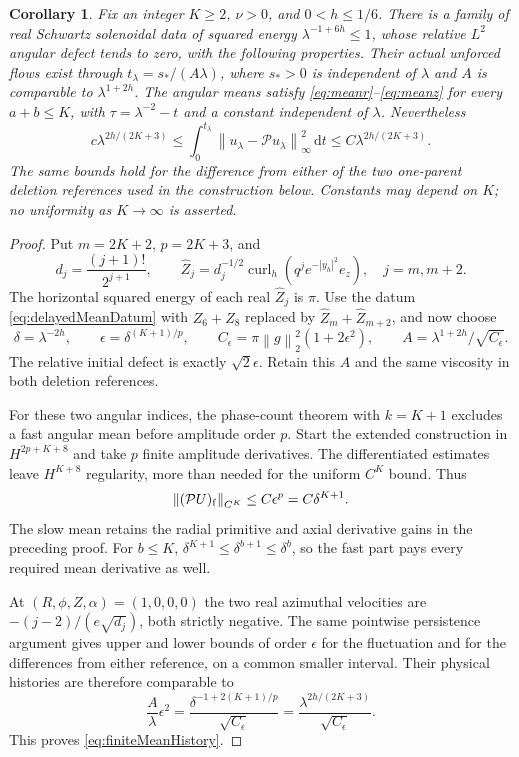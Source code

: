 \documentclass[11pt]{article}
\newtheorem{corollary}[theorem]{Corollary}
\theoremstyle{remark}
\newcommand{\PP}{\mathcal P}
\newcommand{\dd}{\,\mathrm d}
\newcommand{\norm}[1]{\left\lVert#1\right\rVert}
\newcommand{\curl}{\operatorname{curl}}
\begin{document}
\begin{corollary}\label{cor:finiteMeanDerivatives}
Fix an integer $K\geq2$, $\nu>0$, and $0<h\leq1/6$.
There is a family of real Schwartz solenoidal data of squared energy
$\lambda^{-1+6h}\leq1$, whose relative $L^2$ angular defect tends to
zero, with the following properties. Their actual unforced flows
exist through $t_\lambda=s_*/(A\lambda)$, where $s_*>0$ is independent
of $\lambda$ and $A$ is comparable to $\lambda^{1+2h}$.
The angular means satisfy \eqref{eq:meanr}--\eqref{eq:meanz} for
\emph{every} $a+b\leq K$, with $\tau=\lambda^{-2}-t$ and a
constant independent of $\lambda$. Nevertheless
\begin{equation}\label{eq:finiteMeanHistory}
 c\lambda^{2h/(2K+3)}
 \leq\int_0^{t_\lambda}\norm{u_\lambda-\PP u_\lambda}_\infty^2\dd t
 \leq C\lambda^{2h/(2K+3)}.
\end{equation}
The same bounds hold for the difference from either of the two
one-parent deletion references used in the construction below.
Constants may depend on $K$; no uniformity as $K\to\infty$ is asserted.
\end{corollary}

\begin{proof}
Put $m=2K+2$, $p=2K+3$, and
\[
 d_j=\frac{(j+1)!}{2^{j+1}},\qquad
 \widehat Z_j=d_j^{-1/2}\curl_h(q^j e^{-|y_h|^2}e_z),
                       \quad j=m,m+2.
\]
The horizontal squared energy of each real $\widehat Z_j$ is $\pi$.
Use the datum \eqref{eq:delayedMeanDatum} with $Z_6+Z_8$ replaced
by $\widehat Z_m+\widehat Z_{m+2}$, and now choose
\[
 \delta=\lambda^{-2h},\qquad
 \epsilon=\delta^{(K+1)/p},\qquad
 C_\epsilon=\pi\norm g_2^2(1+2\epsilon^2),\qquad
 A=\lambda^{1+2h}/\sqrt{C_\epsilon}.
\]
The relative initial defect is exactly $\sqrt2\epsilon$.
Retain this $A$ and the same viscosity in both deletion references.

For these two angular indices, the phase-count theorem with $k=K+1$
excludes a fast angular mean before amplitude order $p$.
Start the extended construction in $H^{2p+K+8}$ and take $p$ finite
amplitude derivatives. The differentiated estimates leave $H^{K+8}$
regularity, more than needed for the uniform $C^K$ bound. Thus
\[
 \norm{(\PP U)_{\rm f}}_{C^K}\leq C\epsilon^p
                                      =C\delta^{K+1}.
\]
The slow mean retains the radial primitive and axial derivative
gains in the preceding proof. For $b\leq K$,
$\delta^{K+1}\leq\delta^{b+1}\leq\delta^b$, so the fast part
pays every required mean derivative as well.

At $(R,\phi,Z,\alpha)=(1,0,0,0)$ the two real azimuthal
velocities are $-(j-2)/(e\sqrt{d_j})$, both strictly negative.
The same pointwise persistence argument gives upper and lower
bounds of order $\epsilon$ for the fluctuation and for the
differences from either reference, on a common smaller interval.
Their physical histories are therefore comparable to
\[
 \frac A\lambda\epsilon^2
   =\frac{\delta^{-1+2(K+1)/p}}{\sqrt{C_\epsilon}}
   =\frac{\lambda^{2h/(2K+3)}}{\sqrt{C_\epsilon}}.
\]
This proves \eqref{eq:finiteMeanHistory}.
\end{proof}
\end{document}
